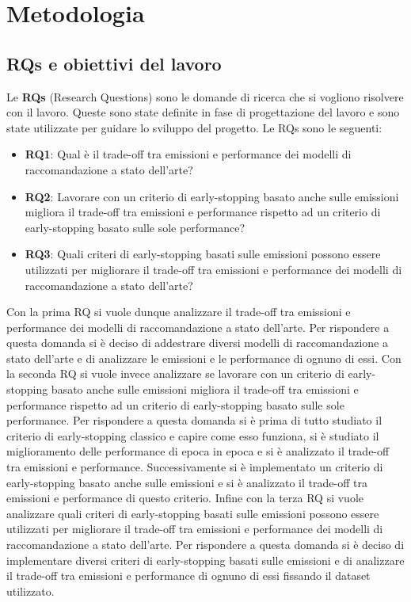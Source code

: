 \section{Metodologia}

\subsection{RQs e obiettivi del lavoro}

Le \textbf{RQs} (Research Questions) sono le domande di ricerca che si vogliono risolvere con il lavoro. Queste sono state definite in fase di progettazione del lavoro e sono state utilizzate per guidare lo sviluppo del progetto. Le RQs sono le seguenti:
\begin{itemize}
    \item \textbf{RQ1}: Qual è il trade-off tra emissioni e performance dei modelli di raccomandazione a stato dell'arte?
    \item \textbf{RQ2}: Lavorare con un criterio di early-stopping basato anche sulle emissioni migliora il trade-off tra emissioni e performance rispetto ad un criterio di early-stopping basato sulle sole performance?
    \item \textbf{RQ3}: Quali criteri di early-stopping basati sulle emissioni possono essere utilizzati per migliorare il trade-off tra emissioni e performance dei modelli di raccomandazione a stato dell'arte?
\end{itemize}

\noindent Con la prima RQ si vuole dunque analizzare il trade-off tra emissioni e performance dei modelli di raccomandazione a stato dell'arte. Per rispondere a questa domanda si è deciso di addestrare diversi modelli di raccomandazione a stato dell'arte e di analizzare le emissioni e le performance di ognuno di essi. Con la seconda RQ si vuole invece analizzare se lavorare con un criterio di early-stopping basato anche sulle emissioni migliora il trade-off tra emissioni e performance rispetto ad un criterio di early-stopping basato sulle sole performance. Per rispondere a questa domanda si è prima di tutto studiato il criterio di early-stopping classico e capire come esso funziona, si è studiato il miglioramento delle performance di epoca in epoca e si è analizzato il trade-off tra emissioni e performance. Successivamente si è implementato un criterio di early-stopping basato anche sulle emissioni e si è analizzato il trade-off tra emissioni e performance di questo criterio. Infine con la terza RQ si vuole analizzare quali criteri di early-stopping basati sulle emissioni possono essere utilizzati per migliorare il trade-off tra emissioni e performance dei modelli di raccomandazione a stato dell'arte. Per rispondere a questa domanda si è deciso di implementare diversi criteri di early-stopping basati sulle emissioni e di analizzare il trade-off tra emissioni e performance di ognuno di essi fissando il dataset utilizzato.

